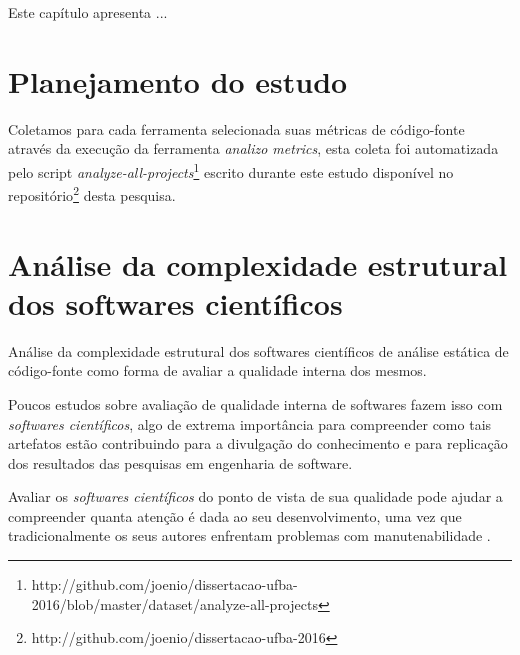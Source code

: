 {Este capítulo apresenta ...}


\section{Planejamento do estudo}

Coletamos para cada ferramenta selecionada suas métricas de código-fonte
através da execução da ferramenta {\it analizo metrics}, esta coleta foi
automatizada pelo script {\it
analyze-all-projects}\footnote{http://github.com/joenio/dissertacao-ufba-2016/blob/master/dataset/analyze-all-projects}
escrito durante este estudo disponível no
repositório\footnote{http://github.com/joenio/dissertacao-ufba-2016} desta
pesquisa.

\section{Análise da complexidade estrutural dos softwares científicos}

Análise da complexidade estrutural dos softwares científicos de análise
estática de código-fonte como forma de avaliar a qualidade interna dos mesmos.

\label{complexidade-ferramentas}

% 

Poucos estudos sobre avaliação de qualidade interna de softwares fazem isso com
{\it softwares científicos}, algo de extrema importância para compreender como
tais artefatos estão contribuindo para a divulgação do conhecimento e para
replicação dos resultados das pesquisas em engenharia de software.

Avaliar os {\it softwares científicos} do ponto de vista de sua qualidade pode
ajudar a compreender quanta atenção é dada ao seu desenvolvimento, uma vez que
tradicionalmente os seus autores enfrentam problemas com manutenabilidade
\cite{Prlic2012}.

